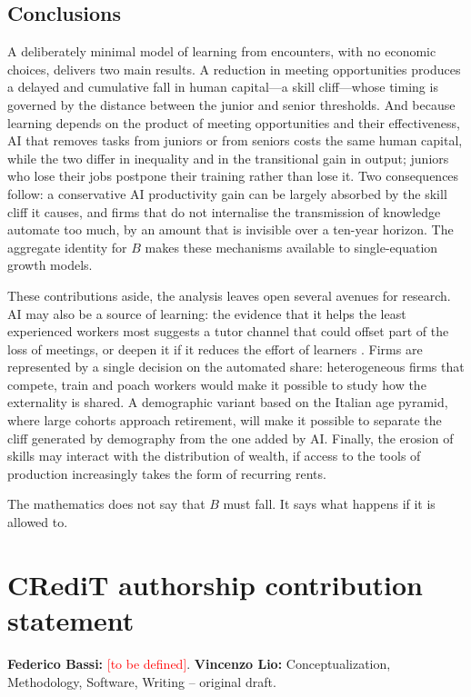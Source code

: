 \documentclass[preprint,12pt,authoryear]{elsarticle}
\newcommand{\todo}[1]{\textcolor{red}{[#1]}}
\begin{document}
\subsection{Conclusions}

A deliberately minimal model of learning from encounters, with no economic choices, delivers two main results. A reduction in meeting opportunities produces a delayed and cumulative fall in human capital---a skill cliff---whose timing is governed by the distance between the junior and senior thresholds. And because learning depends on the product of meeting opportunities and their effectiveness, AI that removes tasks from juniors or from seniors costs the same human capital, while the two differ in inequality and in the transitional gain in output; juniors who lose their jobs postpone their training rather than lose it. Two consequences follow: a conservative AI productivity gain can be largely absorbed by the skill cliff it causes, and firms that do not internalise the transmission of knowledge automate too much, by an amount that is invisible over a ten-year horizon. The aggregate identity for $B$ makes these mechanisms available to single-equation growth models.

These contributions aside, the analysis leaves open several avenues for research. AI may also be a source of learning: the evidence that it helps the least experienced workers most \citep{BrynjolfssonLiRaymond2025} suggests a tutor channel that could offset part of the loss of meetings, or deepen it if it reduces the effort of learners \citep{Ide2026}. Firms are represented by a single decision on the automated share: heterogeneous firms that compete, train and poach workers would make it possible to study how the externality is shared. A demographic variant based on the Italian age pyramid, where large cohorts approach retirement, will make it possible to separate the cliff generated by demography from the one added by AI. Finally, the erosion of skills may interact with the distribution of wealth, if access to the tools of production increasingly takes the form of recurring rents.

The mathematics does not say that $B$ must fall. It says what happens if it is allowed to.

\section*{CRediT authorship contribution statement}
\textbf{Federico Bassi:} \todo{to be defined}. \textbf{Vincenzo Lio:} Conceptualization, Methodology, Software, Writing -- original draft.
\end{document}
